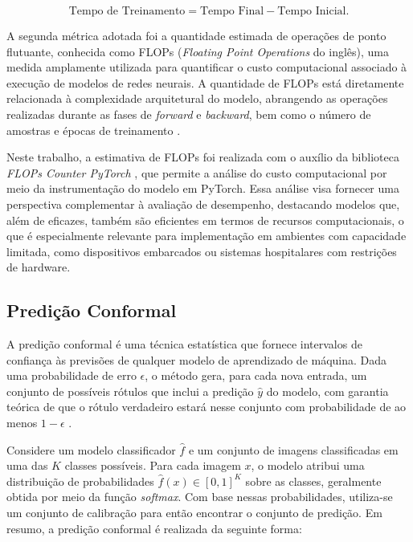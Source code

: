 \begin{equation}
    \text{Tempo de Treinamento} = \text{Tempo Final} - \text{Tempo Inicial} \text{.}
\end{equation}

A segunda métrica adotada foi a quantidade estimada de operações de ponto flutuante, conhecida como FLOPs (\textit{Floating Point Operations} do inglês), uma medida amplamente utilizada para quantificar o custo computacional associado à execução de modelos de redes neurais. A quantidade de FLOPs está diretamente relacionada à complexidade arquitetural do modelo, abrangendo as operações realizadas durante as fases de \textit{forward} e \textit{backward}, bem como o número de amostras e épocas de treinamento \citep{Lohn2022}.

Neste trabalho, a estimativa de FLOPs foi realizada com o auxílio da biblioteca \textit{FLOPs Counter PyTorch} \citep{ptflops}, que permite a análise do custo computacional por meio da instrumentação do modelo em PyTorch. Essa análise visa fornecer uma perspectiva complementar à avaliação de desempenho, destacando modelos que, além de eficazes, também são eficientes em termos de recursos computacionais, o que é especialmente relevante para implementação em ambientes com capacidade limitada, como dispositivos embarcados ou sistemas hospitalares com restrições de hardware.

\subsection{Predição Conformal} \label{sec:conformal-prediction}

A predição conformal é uma técnica estatística que fornece intervalos de confiança às previsões de qualquer modelo de aprendizado de máquina. Dada uma probabilidade de erro $\epsilon$, o método gera, para cada nova entrada, um conjunto de possíveis rótulos que inclui a predição $\hat{y}$ do modelo, com garantia teórica de que o rótulo verdadeiro estará nesse conjunto com probabilidade de ao menos $1 - \epsilon$ \citep{angelopoulos2021gentle}.

Considere um modelo classificador $\hat{f}$ e um conjunto de imagens classificadas em uma das $K$ classes possíveis. Para cada imagem $x$, o modelo atribui uma distribuição de probabilidades $\hat{f}(x) \in [0,1]^K$ sobre as classes, geralmente obtida por meio da função \textit{softmax}. Com base nessas probabilidades, utiliza-se um conjunto de calibração para então encontrar o conjunto de predição. Em resumo, a predição conformal é realizada da seguinte forma:

